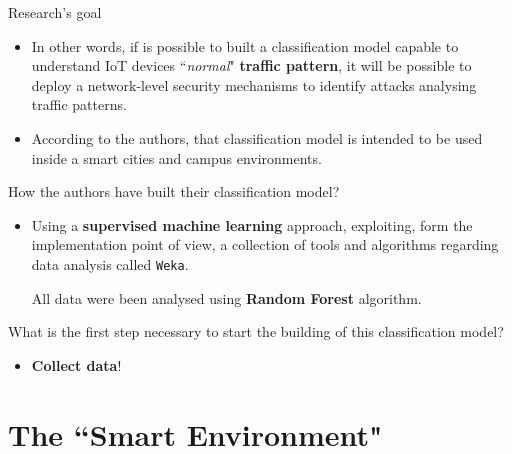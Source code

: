 \documentclass[10pt]{beamer}
\begin{document}
\begin{frame}{Research's goal}

\begin{itemize}
\justifying
\item In other words, if is possible to built a classification model capable to understand IoT devices ``\textit{normal}" \textbf{traffic pattern}, it will be possible to deploy a network-level security mechanisms to identify attacks analysing traffic patterns.

\item According to the authors, that classification model is intended to be used inside a smart cities and campus environments.
\end{itemize}

\begin{alertblock}{}
\justifying
How the authors have built their classification model?
\end{alertblock}

\begin{itemize}
\justifying
\item Using a \textbf{supervised machine learning} approach, exploiting, form the implementation point of view, a collection of tools and algorithms regarding data analysis called \texttt{Weka}.

All data were been analysed using \textbf{Random Forest} algorithm.
\end{itemize}

\begin{alertblock}{}
\justifying
What is the first step necessary to start the building of this classification model?
\end{alertblock}

\begin{itemize}
\item \textbf{Collect data}!
\end{itemize}

\end{frame} 
\section{The ``Smart Environment"}
\end{document}
